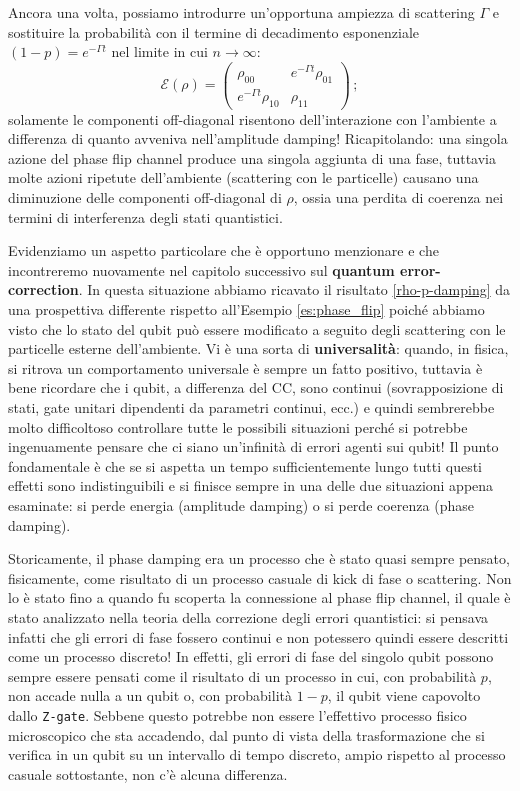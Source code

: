 Ancora una volta, possiamo introdurre un'opportuna ampiezza di scattering $\Gamma$ e sostituire la probabilità con il termine di decadimento esponenziale $(1-p)=e^{-\Gamma t}$ nel limite in cui $n \to \infty$:
\begin{equation}\label{rho_final_phase_damping}
    \mathcal{E}(\rho) = \begin{pmatrix}
                            \rho_{00} & e^{-\Gamma t}\rho_{01} \\
                            e^{-\Gamma t}\rho_{10} & \rho_{11}
                        \end{pmatrix} \, ;
\end{equation}
solamente le componenti off-diagonal risentono dell'interazione con l'ambiente a differenza di quanto avveniva nell'amplitude damping! Ricapitolando: una singola azione del phase flip channel produce una singola aggiunta di una fase, tuttavia molte azioni ripetute dell'ambiente (scattering con le particelle) causano una diminuzione delle componenti off-diagonal di $\rho$, ossia una perdita di coerenza nei termini di interferenza degli stati quantistici.

\noindent Evidenziamo un aspetto particolare che è opportuno menzionare e che incontreremo nuovamente nel capitolo successivo sul \textbf{quantum error-correction}. In questa situazione abbiamo ricavato il risultato \eqref{rho-p-damping} da una prospettiva differente rispetto all'Esempio \ref{es:phase_flip} poiché abbiamo visto che lo stato del qubit può essere modificato a seguito degli scattering con le particelle esterne dell'ambiente. Vi è una sorta di \textbf{universalità}: quando, in fisica, si ritrova un comportamento universale è sempre un fatto positivo, tuttavia è bene ricordare che i qubit, a differenza del CC, sono continui (sovrapposizione di stati, gate unitari dipendenti da parametri continui, ecc.) e quindi sembrerebbe molto difficoltoso controllare tutte le possibili situazioni perché si potrebbe ingenuamente pensare che ci siano un'infinità di errori agenti sui qubit! Il punto fondamentale è che se si aspetta un tempo sufficientemente lungo tutti questi effetti sono indistinguibili e si finisce sempre in una delle due situazioni appena esaminate: si perde energia (amplitude damping) o si perde coerenza (phase damping).

\noindent Storicamente, il phase damping era un processo che è stato quasi sempre pensato, fisicamente, come risultato di un processo casuale di kick di fase o scattering. Non lo è stato fino a quando fu scoperta la connessione al phase flip channel, il quale è stato analizzato nella teoria della correzione degli errori quantistici: si pensava infatti che gli errori di fase fossero continui e non potessero quindi essere descritti come un processo discreto! In effetti, gli errori di fase del singolo qubit possono sempre essere pensati come il risultato di un processo in cui, con probabilità $p$, non accade nulla a un qubit o, con probabilità $1-p$, il qubit viene capovolto dallo \texttt{Z-gate}. Sebbene questo potrebbe non essere l'effettivo processo fisico microscopico che sta accadendo, dal punto di vista della trasformazione che si verifica in un qubit su un intervallo di tempo discreto, ampio rispetto al processo casuale sottostante, non c'è alcuna differenza.

